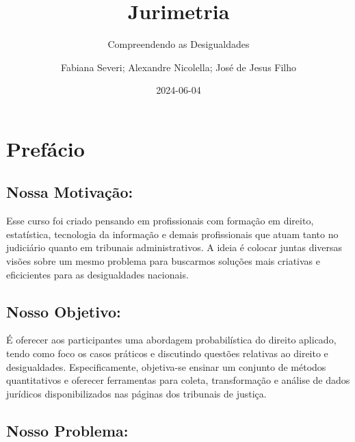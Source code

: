 \documentclass[
  letterpaper,
  DIV=11,
  numbers=noendperiod]{scrreprt}
\title{Jurimetria}
\subtitle{Compreendendo as Desigualdades}
\author{Fabiana Severi; Alexandre Nicolella; José de Jesus Filho}
\date{2024-06-04}
\renewcommand*\contentsname{Table of contents}
\newcommand\contentsname{Table of contents}
\begin{document}
\maketitle
\ifdefined\Shaded\renewenvironment{Shaded}{\begin{tcolorbox}[interior hidden, boxrule=0pt, frame hidden, sharp corners, breakable, borderline west={3pt}{0pt}{shadecolor}, enhanced]}{\end{tcolorbox}}\fi

\renewcommand*\contentsname{Table of contents}
{
\hypersetup{linkcolor=}
\setcounter{tocdepth}{2}
\tableofcontents
}

\hypertarget{prefuxe1cio}{%
\chapter{Prefácio}\label{prefuxe1cio}}

\hypertarget{nossa-motivauxe7uxe3o}{%
\section{\texorpdfstring{\textbf{Nossa
Motivação:}}{Nossa Motivação:}}\label{nossa-motivauxe7uxe3o}}

Esse curso foi criado pensando em profissionais com formação em direito,
estatística, tecnologia da informação e demais profissionais que atuam
tanto no judiciário quanto em tribunais administrativos. A ideia é
colocar juntas diversas visões sobre um mesmo problema para buscarmos
soluções mais criativas e eficicientes para as desigualdades nacionais.

\hypertarget{nosso-objetivo}{%
\section{\texorpdfstring{\textbf{Nosso
Objetivo}:}{Nosso Objetivo:}}\label{nosso-objetivo}}

É oferecer aos participantes uma abordagem probabilística do direito
aplicado, tendo como foco os casos práticos e discutindo questões
relativas ao direito e desigualdades. Especificamente, objetiva-se
ensinar um conjunto de métodos quantitativos e oferecer ferramentas para
coleta, transformação e análise de dados jurídicos disponibilizados nas
páginas dos tribunais de justiça.

\hypertarget{nosso-problema}{%
\section{\texorpdfstring{\textbf{Nosso
Problema}:}{Nosso Problema:}}\label{nosso-problema}}
\end{document}
